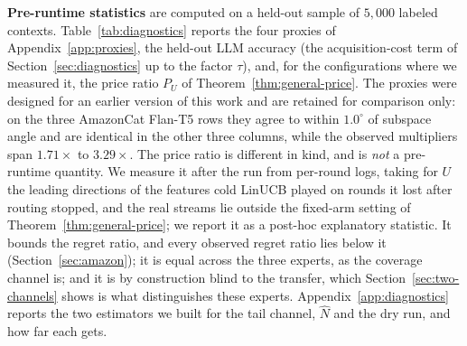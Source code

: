 \documentclass{article}
\theoremstyle{definition}
\theoremstyle{remark}
\theoremstyle{remark}
\begin{document}
\textbf{Pre-runtime statistics} are computed on a held-out sample of
$5{,}000$ labeled contexts. Table~\ref{tab:diagnostics} reports the four
proxies of Appendix~\ref{app:proxies}, the held-out LLM accuracy (the
acquisition-cost term of Section~\ref{sec:diagnostics} up to the factor
$\tau$), and, for the configurations where we measured it, the price ratio
$P_U$ of Theorem~\ref{thm:general-price}. The proxies were designed for an
earlier version of this work and are retained for comparison only: on the
three AmazonCat Flan-T5 rows they agree to within $1.0^\circ$ of subspace
angle and are identical in the other three columns, while the observed
multipliers span $1.71\times$ to $3.29\times$. The price ratio is different
in kind, and is \emph{not} a pre-runtime quantity. We measure it after the run
from per-round logs, taking for $U$ the leading directions of the features
cold LinUCB played on rounds it lost after routing stopped, and the real
streams lie outside the fixed-arm setting of Theorem~\ref{thm:general-price};
we report it as a post-hoc explanatory statistic. It bounds the regret ratio,
and every observed regret ratio lies below it (Section~\ref{sec:amazon}); it is
equal across the three experts, as the coverage channel is; and it is by
construction blind to the transfer, which Section~\ref{sec:two-channels} shows
is what distinguishes these experts. Appendix~\ref{app:diagnostics} reports
the two estimators we built for the tail channel, $\widehat N$ and the dry run,
and how far each gets.
\end{document}
